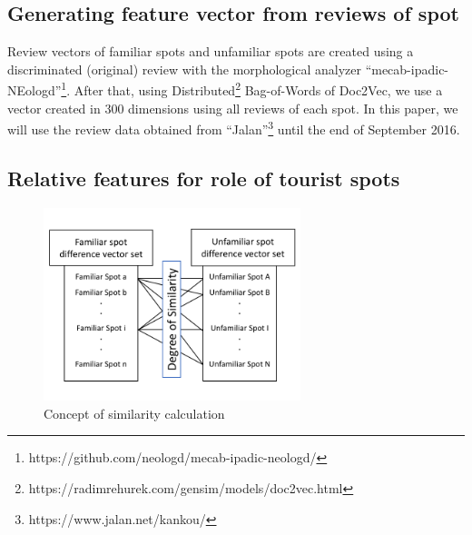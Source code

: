 \documentclass[journal]{IAENGtran}
\begin{document}
\subsection{Generating feature vector from reviews of spot}
\label{subsec:Generating feature vector from reviews of spot}
Review vectors of familiar spots and unfamiliar spots are created using a discriminated (original) review with the morphological analyzer\cite{Codd10} ``mecab-ipadic-NEologd''\footnote{https://github.com/neologd/mecab-ipadic-neologd/}.
After that, using Distributed\footnote{https://radimrehurek.com/gensim/models/doc2vec.html} Bag-of-Words of Doc2Vec, we use a vector created in 300 dimensions using all reviews of each spot.
In this paper, we will use the review data obtained from ``Jalan''\footnote{https://www.jalan.net/kankou/} until the end of September 2016.

\subsection{Relative features for role of tourist spots}
\label{subsec:Relative features of tourist spots}

\begin{figure}[t]
  \begin{center}
    \includegraphics[clip,width=7.5cm,bb=0 0 720 540]{picture/Photo_CosSim_eng.png}
    \caption{Concept of similarity calculation}
    \label{fig:Photo_CosSim}
    \end{center}
\end{figure}
\end{document}
